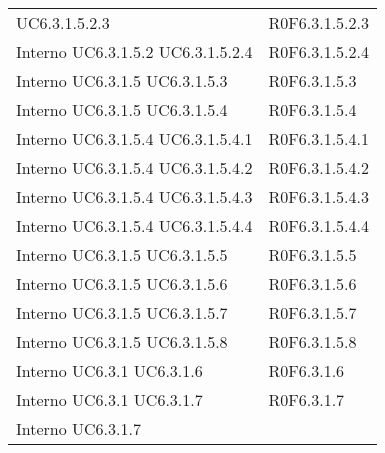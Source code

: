 \begin{longtable}{p{2.5cm}!{\VRule[1pt]}p{2.5cm}}
 \newline UC6.3.1.5.2.3
 & R0F6.3.1.5.2.3 \\
Interno \newline UC6.3.1.5.2
 \newline UC6.3.1.5.2.4
 & R0F6.3.1.5.2.4 \\
Interno \newline UC6.3.1.5
 \newline UC6.3.1.5.3
 & R0F6.3.1.5.3 \\
Interno \newline UC6.3.1.5
 \newline UC6.3.1.5.4
 & R0F6.3.1.5.4 \\
Interno \newline UC6.3.1.5.4
 \newline UC6.3.1.5.4.1
 & R0F6.3.1.5.4.1 \\
Interno \newline UC6.3.1.5.4
 \newline UC6.3.1.5.4.2
 & R0F6.3.1.5.4.2 \\
Interno \newline UC6.3.1.5.4
 \newline UC6.3.1.5.4.3
 & R0F6.3.1.5.4.3 \\
Interno \newline UC6.3.1.5.4
 \newline UC6.3.1.5.4.4
 & R0F6.3.1.5.4.4 \\
Interno \newline UC6.3.1.5
 \newline UC6.3.1.5.5
 & R0F6.3.1.5.5 \\
Interno \newline UC6.3.1.5
 \newline UC6.3.1.5.6
 & R0F6.3.1.5.6 \\
Interno \newline UC6.3.1.5
 \newline UC6.3.1.5.7
 & R0F6.3.1.5.7 \\
Interno \newline UC6.3.1.5
 \newline UC6.3.1.5.8
 & R0F6.3.1.5.8 \\
Interno \newline UC6.3.1
 \newline UC6.3.1.6
 & R0F6.3.1.6 \\
Interno \newline UC6.3.1
 \newline UC6.3.1.7
 & R0F6.3.1.7 \\
Interno \newline UC6.3.1.7

\end{longtable}
